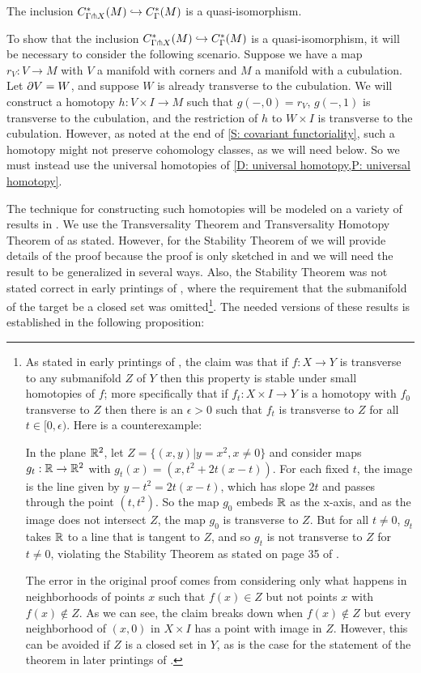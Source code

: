 \begin{theorem}\label{T: transverse complex}
	The inclusion $C^*_{\Gamma \pitchfork X}(M) \hookrightarrow C^*_\Gamma(M)$ is a quasi-isomorphism.
\end{theorem}

To show that the inclusion $C^*_{\Gamma \pitchfork X}(M) \hookrightarrow C^*_\Gamma(M)$ is a quasi-isomorphism, it will be necessary to consider the following scenario.
Suppose we have a map $r_V \colon V \to M$ with $V$ a manifold with corners and $M$ a manifold with a cubulation.
Let $\partial V = W$, and suppose $W$ is already transverse to the cubulation.
We will construct a homotopy $h \colon V \times I \to M$ such that $g(-,0) = r_V$, $g(-,1)$ is transverse to the cubulation, and the restriction of $h$ to $W \times I$ is transverse to the cubulation. However, as noted at the end of \cref{S: covariant functoriality}, such a homotopy might not preserve cohomology classes, as we will need below. So we must instead use the universal homotopies of \cref{D: universal homotopy,P: universal homotopy}.


The technique for constructing such homotopies will be modeled on a variety of results in \cite{GuPo74}.
We use the Transversality Theorem and Transversality Homotopy Theorem of \cite[Section 2.3]{GuPo74} as stated.
However, for the Stability Theorem of \cite[Section 1.6]{GuPo74} we will provide details of the proof because the proof is only sketched in \cite{GuPo74} and we will need the result to be generalized in several ways.
Also, the Stability Theorem was not stated correct in early printings of \cite{GuPo74}, where the requirement that the submanifold of the target be a closed set was omitted\footnote{As stated in early printings of \cite{GuPo74}, the claim was that if $f \colon X \to Y$ is transverse to any submanifold $Z$ of $Y$ then this property is stable under small homotopies of $f$; more specifically that if $f_t:X \times I \to Y$ is a homotopy with $f_0$ transverse to $Z$ then there is an $\epsilon>0$ such that $f_t$ is transverse to $Z$ for all $t\in[0,\epsilon)$.
Here is a counterexample:

In the plane $\mathbb{R}^2$, let $Z = \{(x,y)|y = x^2, x\neq 0\}$ and consider maps $g_t: \mathbb{R} \to \mathbb{R}^2$ with
$g_t(x) = (x,t^2+2t(x-t))$.
For each fixed $t$, the image is the line given by $y-t^2 = 2t(x-t)$, which has slope $2t$ and passes through the point $(t,t^2)$.
So the map $g_0$ embeds $\mathbb{R}$ as the x-axis, and as the image does not intersect $Z$, the map $g_0$ is transverse to $Z$.
But for all $t\neq 0$, $g_t$ takes $\mathbb{R}$ to a line that is tangent to $Z$, and so $g_t$ is not transverse to $Z$ for $t\neq 0$, violating the Stability Theorem as stated on page 35 of \cite{GuPo74}.

The error in the original proof comes from considering only what happens in neighborhoods of points $x$ such that $f(x) \in Z$ but not points $x$ with $f(x)\notin Z$.
As we can see, the claim breaks down when $f(x)\notin Z$ but every neighborhood of $(x,0)$ in $X \times I$ has a point with image in $Z$.
However, this can be avoided if $Z$ is a closed set in $Y$, as is the case for the statement of the theorem in later printings of \cite{GuPo74}.}.
The needed versions of these results is established in the following proposition:

